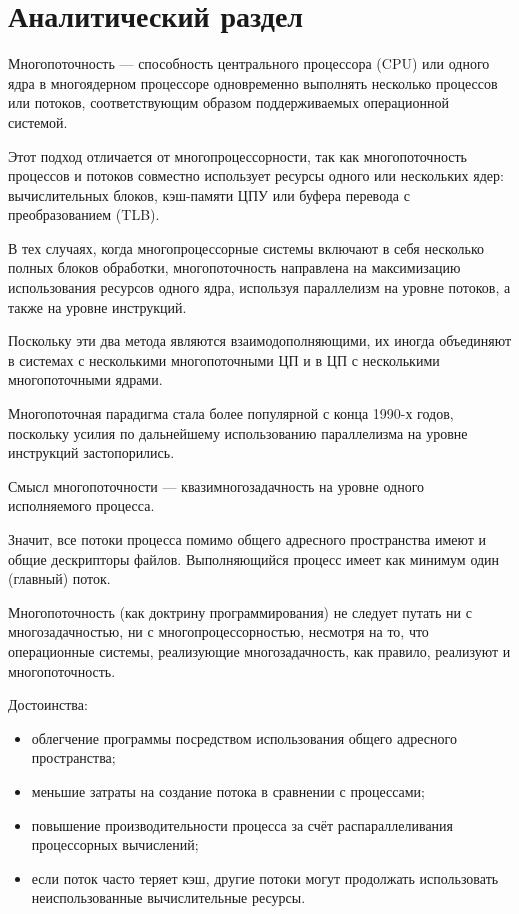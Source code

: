 \chapter{Аналитический раздел}

Многопоточность — способность центрального процессора (CPU) или одного ядра в многоядерном процессоре одновременно выполнять несколько процессов или потоков, соответствующим образом поддерживаемых операционной системой.

Этот подход отличается от многопроцессорности, так как многопоточность процессов и потоков совместно использует ресурсы одного или нескольких ядер: вычислительных блоков, кэш-памяти ЦПУ или буфера перевода с преобразованием (TLB).


В тех случаях, когда многопроцессорные системы включают в себя несколько полных блоков обработки, многопоточность направлена на максимизацию использования ресурсов одного ядра, используя параллелизм на уровне потоков, а также на уровне инструкций.

Поскольку эти два метода являются взаимодополняющими, их иногда объединяют в системах с несколькими многопоточными ЦП и в ЦП с несколькими многопоточными ядрами.


Многопоточная парадигма стала более популярной с конца 1990-х годов, поскольку усилия по дальнейшему использованию параллелизма на уровне инструкций застопорились.

Смысл многопоточности — квазимногозадачность на уровне одного исполняемого процесса.

Значит, все потоки процесса помимо общего адресного пространства имеют и общие дескрипторы файлов. Выполняющийся процесс имеет как минимум один (главный) поток.


Многопоточность (как доктрину программирования) не следует путать ни с многозадачностью, ни с многопроцессорностью, несмотря на то, что операционные системы, реализующие многозадачность, как правило, реализуют и многопоточность.


Достоинства:

\begin{itemize}
	
	\item облегчение программы посредством использования общего адресного пространства;
	
	\item меньшие затраты на создание потока в сравнении с процессами;
	
	\item повышение производительности процесса за счёт распараллеливания процессорных вычислений;
	
	\item если поток часто теряет кэш, другие потоки могут продолжать использовать неиспользованные вычислительные ресурсы.
	
\end{itemize}


